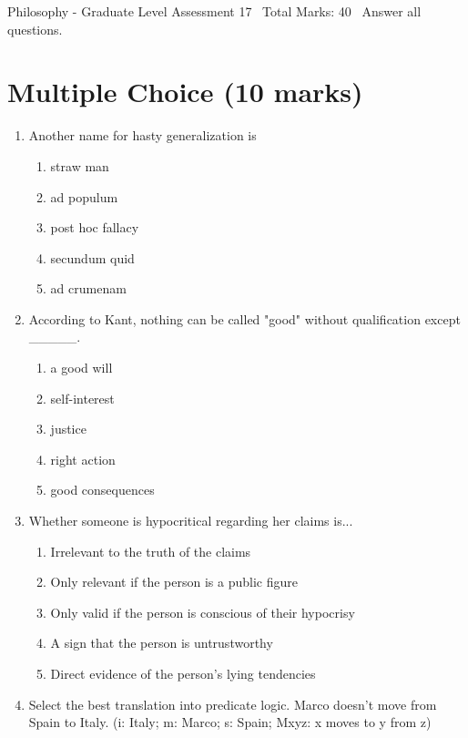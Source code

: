 \documentclass[12pt]{article}
\begin{document}
\begin{center}
Philosophy - Graduate Level Assessment 17 \
Total Marks: 40 \
Answer all questions.
\end{center}

\section*{Multiple Choice (10 marks)}
\begin{enumerate}[label=\arabic*.]
\item Another name for hasty generalization is
\begin{enumerate}[label=(\alph*)]
    \item straw man
    \item ad populum
    \item post hoc fallacy
    \item secundum quid
    \item ad crumenam
\end{enumerate}
\item According to Kant, nothing can be called "good" without qualification except \_\_\_\_\_.
\begin{enumerate}[label=(\alph*)]
    \item a good will
    \item self-interest
    \item justice
    \item right action
    \item good consequences
\end{enumerate}
\item Whether someone is hypocritical regarding her claims is...
\begin{enumerate}[label=(\alph*)]
    \item Irrelevant to the truth of the claims
    \item Only relevant if the person is a public figure
    \item Only valid if the person is conscious of their hypocrisy
    \item A sign that the person is untrustworthy
    \item Direct evidence of the person's lying tendencies
\end{enumerate}
\item Select the best translation into predicate logic. Marco doesn't move from Spain to Italy. (i: Italy; m: Marco; s: Spain; Mxyz: x moves to y from z)
\begin{enumerate}[label=(\alph*)]

\end{enumerate}
\end{enumerate}
\end{document}
